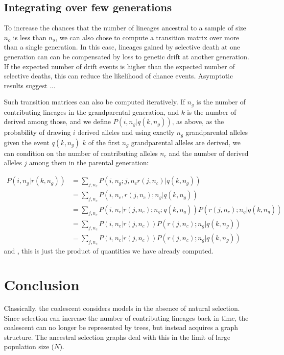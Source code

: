 \documentclass[review]{elsarticle}
\newcommand{\sgcomment}[1]{{\color{red}{SG: #1}}}
\begin{document}
\subsection
{Integrating over few generations} 
To increase the chances that the number of lineages ancestral to a sample 
of size $n_o$ is less than $n_o$, we can also chose to compute a transition matrix over more 
than a single generation. In this case, lineages gained by selective death at one generation can 
can be compensated by loss to genetic drift at another generation. If the expected number of 
drift events is higher than the expected number of selective deaths, this can reduce the likelihood 
of chance events. Asymptotic results suggest ... 

Such transition matrices can also be computed iteratively. If $n_g$ is the number of contributing
lineages in the grandparental generation, and $k$ is the number of derived among those, and we
define $P(i, n_g | q(k, n_g))$, as above, as the probability of drawing $i$ derived alleles and
using exactly $n_g$ grandparental alleles given the event $q(k, n_g)$ $k$ of the first $n_g$
grandparental alleles are derived, we can condition on the number of contributing alleles $n_c$ and
the number of derived alleles $j$ among them in the parental generation:
 
 \begin{equation}
 \begin{split}
 P(i, n_g | r(k, n_g)) & = \sum_{j,n_c} P(i, n_g ; j, n_c r(j,n_c)  | q(k, n_g))\\
 &= \sum_{j,n_c} P(i, n_c,  r(j,n_c); n_g  | q(k, n_g))\\
 &= \sum_{j,n_c} P(i, n_c|   r(j,n_c); n_g  ; q(k, n_g))  P(r(j,n_c); n_g  | q(k, n_g))\\
 &= \sum_{j,n_c} P(i, n_c |   r(j,n_c))  P( r(j,n_c); n_g  | q(k, n_g))\\
 &= \sum_{j,n_c} P(i, n_c |   r(j,n_c))  P( r(j,n_c); n_g  | q(k, n_g))
 \end{split}
\end{equation}
and \sgcomment{despite the crap notation}, this is just the product of quantities we have already computed.


\section{Conclusion}
\label{sec:conclusion}

Classically, the coalescent considers models in the absence of natural selection. Since selection
can increase the number of contributing lineages back in time, the coalescent can no longer be
represented by trees, but instead acquires a graph structure. The ancestral selection graphs
\citep{KroneNeuhauser1997} deal with this in the limit of large population size ($N$).
\end{document}
